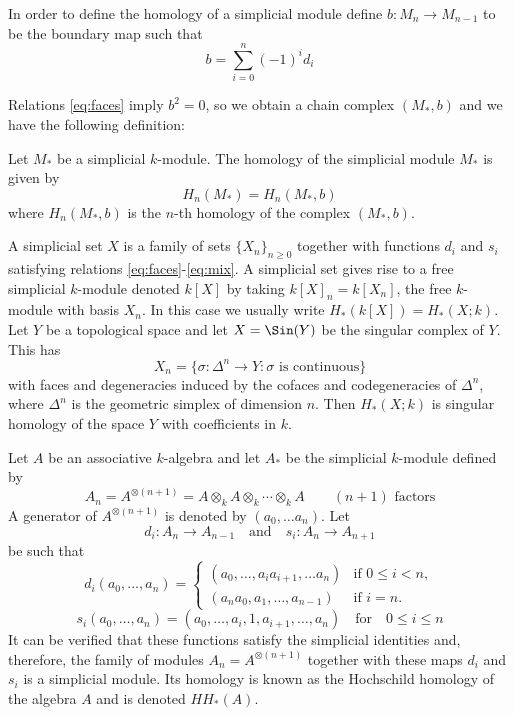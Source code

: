 In order to define the homology of a simplicial module define
$b \colon  M_n \rightarrow M_{n-1}$ to be the boundary map such that
\begin{equation*}
               b=\sum_{i=0}^n(-1)^id_i
\end{equation*}

Relations \eqref{eq:faces} imply $b^2=0$, so we obtain a
chain complex $(M_*,b)$ and we have the following definition:

\begin{defn}
Let $M_*$ be a simplicial $k$-module. The homology of the simplicial module
$M_*$ is given by
\[ H_n(M_*)=H_n(M_*,b) \]
where $H_n(M_*,b)$ is the $n$-th homology of the complex $(M_*,b)$.
\end{defn}
\begin{example}
A simplicial set $X$ is a family of sets $\{X_n\}_{n\geq 0}$ together with
functions $d_i$ and $s_i$ satisfying relations 
\eqref{eq:faces}-\eqref{eq:mix}.
A simplicial set gives rise to a free simplicial $k$-module denoted
$k[X]$ by taking $k[X]_n=k[X_n]$, the free $k$-module with basis
$X_n$. In this case we usually write
$H_*(k[X])=H_*(X;k)$.
Let $Y$ be a topological space and let $X=\Sin(Y)$ be the singular
complex of $Y$. This has 
\[ 
X_n=   \{ \sigma  \colon  
             \Delta^n\rightarrow Y : \text{$\sigma$ is continuous} \} 
\]
with faces and degeneracies induced by the cofaces and codegeneracies
of $\Delta^n$, where $\Delta^n$ is the geometric simplex of dimension $n$.
Then $H_*(X;k)$ is singular homology of the space $Y$ with coefficients in $k$.
\end{example}

\begin{example}\label{tensor_algebra}
Let $A$ be an associative $k$-algebra and let $A_*$ be the simplicial 
$k$-module defined by
\[ 
    A_n=A^{\otimes (n+1)}
       = A\otimes_k A\otimes_k \cdots \otimes_k A 
        \qquad \text{$(n+1)$ factors} 
\]
A generator of $A^{\otimes(n+1)}$ is denoted by $(a_0,\dots a_n)$.
Let
\[ 
d_i \colon A_n\rightarrow A_{n-1} 
\quad \text{and} \quad
   s_i \colon A_n \rightarrow A_{n+1} 
\]
be such that
\[ 
d_i(a_0,\dots ,a_n)=\begin{cases}
                (a_0,\dots , a_ia_{i+1},\dots a_n) & \text{if $0\leq i <n$}, \\
                (a_na_0,a_1,\dots ,a_{n-1})        & \text{if $i=n$}.
                \end{cases}
\]
\[ 
s_i(a_0,\dots ,a_n)=(a_0,\dots , a_i,1, a_{i+1},\dots ,a_n) 
            \quad \text{for} \quad 0\leq i\leq n
\]
It can be verified that these functions satisfy the simplicial identities
and, therefore, the family of modules $A_n=A^{\otimes (n+1)}$ together with
these maps $d_i$ and $s_i$ is a simplicial module.
Its homology is known as the
Hochschild homology of the algebra $A$ and is denoted $HH_*(A)$.
\end{example}

